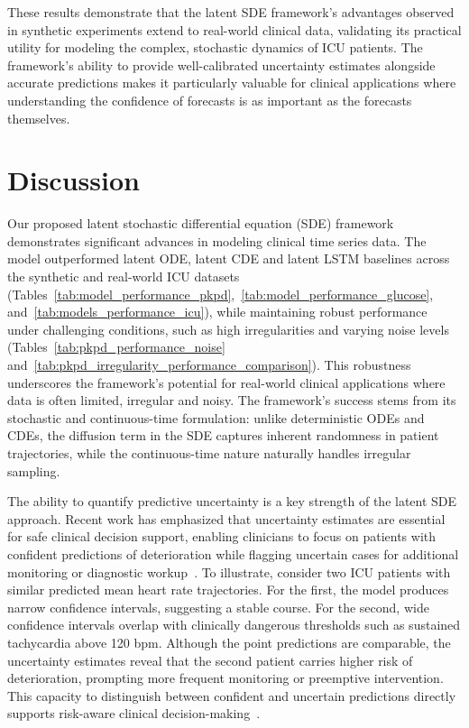 \documentclass[preprint,12pt]{elsarticle}
\begin{document}
These results demonstrate that the latent SDE framework's advantages observed in synthetic experiments extend to real-world clinical data, validating its practical utility for modeling the complex, stochastic dynamics of ICU patients. The framework's ability to provide well-calibrated uncertainty estimates alongside accurate predictions makes it particularly valuable for clinical applications where understanding the confidence of forecasts is as important as the forecasts themselves.

\section{Discussion}
Our proposed latent stochastic differential equation (SDE) framework demonstrates significant advances in modeling clinical time series data. The model outperformed latent ODE, latent CDE and latent LSTM baselines across the synthetic and real-world ICU datasets (Tables~\ref{tab:model_performance_pkpd},~\ref{tab:model_performance_glucose}, and~\ref{tab:models_performance_icu}), while maintaining robust performance under challenging conditions, such as high irregularities and  varying noise levels (Tables~\ref{tab:pkpd_performance_noise} and~\ref{tab:pkpd_irregularity_performance_comparison}). This robustness underscores the framework’s potential for real-world clinical applications where data is often limited, irregular and noisy. The framework's success stems from its stochastic and continuous-time formulation: unlike deterministic ODEs and CDEs, the diffusion term in the SDE captures inherent randomness in patient trajectories, while the continuous-time nature naturally handles irregular sampling.

The ability to quantify predictive uncertainty is a key strength of the latent SDE approach. Recent work has emphasized that uncertainty estimates are essential for safe clinical decision support, enabling clinicians to focus on patients with confident predictions of deterioration while flagging uncertain cases for additional monitoring or diagnostic workup~\citep{tsaneva2025decoding}. To illustrate, consider two ICU patients with similar predicted mean heart rate trajectories. For the first, the model produces narrow confidence intervals, suggesting a stable course. For the second, wide confidence intervals overlap with clinically dangerous thresholds such as sustained tachycardia above 120 bpm. Although the point predictions are comparable, the uncertainty estimates reveal that the second patient carries higher risk of deterioration, prompting more frequent monitoring or preemptive intervention. This capacity to distinguish between confident and uncertain predictions directly supports risk-aware clinical decision-making~\citep{kang2021statistical}.
\end{document}
